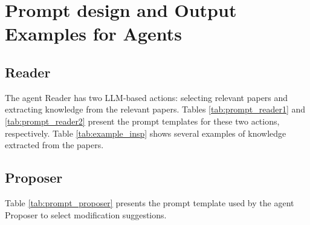 \section{Prompt design and Output Examples for Agents}
\subsection{Reader}
The agent Reader has two LLM-based actions: selecting relevant papers and extracting knowledge from the relevant papers.
Tables \ref{tab:prompt_reader1} and \ref{tab:prompt_reader2} present the prompt templates for these two actions, respectively.
Table \ref{tab:example_insp} shows several examples of knowledge extracted from the papers.
\subsection{Proposer}
Table \ref{tab:prompt_proposer} presents the prompt template used by the agent Proposer to select modification suggestions.
